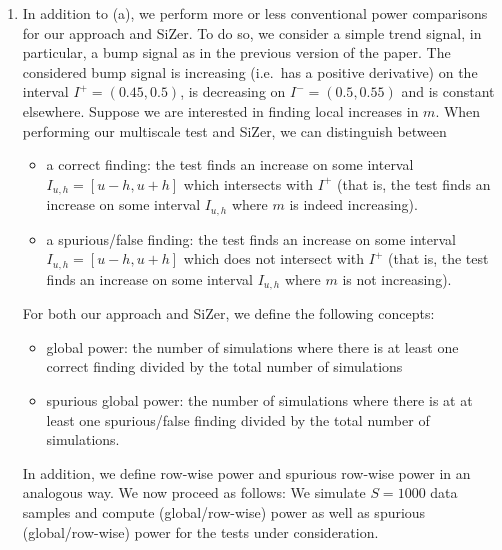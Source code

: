 \documentclass[a4paper,12pt]{article}
\begin{document}
\begin{enumerate}[label=(\arabic*),leftmargin=0.7cm]
\begin{enumerate}[label=(\alph*), leftmargin=0.7cm]
\item In addition to (a), we perform more or less conventional power comparisons for our approach and SiZer. To do so, we consider a simple trend signal, in particular, a bump signal as in the previous version of the paper. The considered bump signal is increasing (i.e.\ has a positive derivative) on the interval $I^+ = (0.45,0.5)$, is decreasing on $I^- = (0.5,0.55)$ and is constant elsewhere. Suppose we are interested in finding local increases in $m$. When performing our multiscale test and SiZer, we can distinguish between 
\begin{itemize}[leftmargin=0.5cm,itemsep=0cm]
\item a correct finding: the test finds an increase on some interval $I_{u,h} = [u-h,u+h]$ which intersects with $I^+$ (that is, the test finds an increase on some interval $I_{u,h}$ where $m$ is indeed increasing).
\item a spurious/false finding: the test finds an increase on some interval $I_{u,h} = [u-h,u+h]$ which does not intersect with $I^+$ (that is, the test finds an increase on some interval $I_{u,h}$ where $m$ is not increasing).
\end{itemize}
For both our approach and SiZer, we define the following concepts: 
\begin{itemize}[leftmargin=0.5cm,itemsep=0cm]
\item global power: the number of simulations where there is at least one correct finding divided by the total number of simulations
\item spurious global power: the number of simulations where there is at at least one spurious/false finding divided by the total number of simulations.
\end{itemize}
In addition, we define row-wise power and spurious row-wise power in an ana\-logous way. We now proceed as follows: We simulate $S=1000$ data samples and compute (global/row-wise) power as well as spurious (global/row-wise) power for the tests under consideration.  


\end{enumerate}
\end{enumerate}
\end{document}
